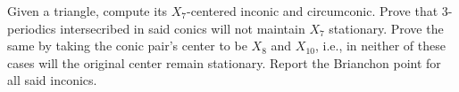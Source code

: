 \begin{question}
Given a triangle, compute its $X_7$-centered inconic and circumconic. Prove that 3-periodics intersecribed in said conics will not maintain $X_7$ stationary. Prove the same by taking the conic pair's center to be $X_8$ and $X_{10}$, i.e., in neither of these cases will the original center remain stationary. Report the Brianchon point for all said inconics.
\label{que:03-x7}
\end{question}



